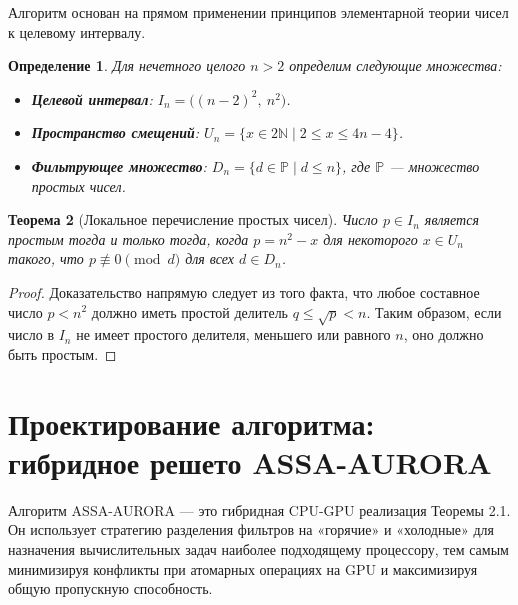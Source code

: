 \documentclass[11pt]{article}
\newtheorem{theorem}{Теорема}[section]
\newtheorem{definition}[theorem]{Определение}
\begin{document}
Алгоритм основан на прямом применении принципов элементарной теории чисел к целевому интервалу.

\begin{definition}
Для нечетного целого $n > 2$ определим следующие множества:
\begin{itemize}[leftmargin=*, noitemsep]
    \item \textbf{Целевой интервал}: $I_n = \big( (n-2)^2,\ n^2 \big)$.
    \item \textbf{Пространство смещений}: $U_n = \{ x \in 2\mathbb{N} \mid 2 \leq x \leq 4n - 4 \}$.
    \item \textbf{Фильтрующее множество}: $D_n = \{ d \in \mathbb{P} \mid d \leq n \}$, где $\mathbb{P}$ — множество простых чисел.
\end{itemize}
\end{definition}

\begin{theorem}[Локальное перечисление простых чисел]
Число $p \in I_n$ является простым тогда и только тогда, когда $p = n^2 - x$ для некоторого $x \in U_n$ такого, что $p \not\equiv 0 \pmod{d}$ для всех $d \in D_n$.
\end{theorem}
\begin{proof}
Доказательство напрямую следует из того факта, что любое составное число $p < n^2$ должно иметь простой делитель $q \leq \sqrt{p} < n$. Таким образом, если число в $I_n$ не имеет простого делителя, меньшего или равного $n$, оно должно быть простым.
\end{proof}

\section{Проектирование алгоритма: гибридное решето ASSA-AURORA}

Алгоритм ASSA-AURORA — это гибридная CPU-GPU реализация Теоремы 2.1. Он использует стратегию разделения фильтров на «горячие» и «холодные» для назначения вычислительных задач наиболее подходящему процессору, тем самым минимизируя конфликты при атомарных операциях на GPU и максимизируя общую пропускную способность.
\end{document}
